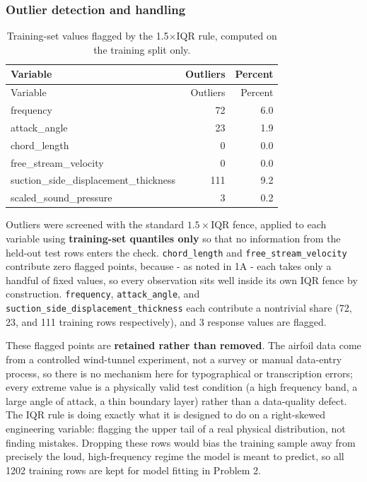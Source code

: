 \documentclass[
  11pt,
]{article}
\begin{document}
\subsubsection{Outlier detection and
handling}\label{outlier-detection-and-handling}

\begin{longtable}[]{@{}lrr@{}}
\caption{Training-set values flagged by the 1.5×IQR rule, computed on
the training split only.}\tabularnewline
\toprule\noalign{}
Variable & Outliers & Percent \\
\midrule\noalign{}
\endfirsthead
\toprule\noalign{}
Variable & Outliers & Percent \\
\midrule\noalign{}
\endhead
\bottomrule\noalign{}
\endlastfoot
frequency & 72 & 6.0 \\
attack\_angle & 23 & 1.9 \\
chord\_length & 0 & 0.0 \\
free\_stream\_velocity & 0 & 0.0 \\
suction\_side\_displacement\_thickness & 111 & 9.2 \\
scaled\_sound\_pressure & 3 & 0.2 \\
\end{longtable}

Outliers were screened with the standard \(1.5\times\text{IQR}\) fence,
applied to each variable using \textbf{training-set quantiles only} so
that no information from the held-out test rows enters the check.
\texttt{chord\_length} and \texttt{free\_stream\_velocity} contribute
zero flagged points, because - as noted in 1A - each takes only a
handful of fixed values, so every observation sits well inside its own
IQR fence by construction. \texttt{frequency}, \texttt{attack\_angle},
and \texttt{suction\_side\_displacement\_thickness} each contribute a
nontrivial share (72, 23, and 111 training rows respectively), and 3
response values are flagged.

These flagged points are \textbf{retained rather than removed}. The
airfoil data come from a controlled wind-tunnel experiment, not a survey
or manual data-entry process, so there is no mechanism here for
typographical or transcription errors; every extreme value is a
physically valid test condition (a high frequency band, a large angle of
attack, a thin boundary layer) rather than a data-quality defect. The
IQR rule is doing exactly what it is designed to do on a right-skewed
engineering variable: flagging the upper tail of a real physical
distribution, not finding mistakes. Dropping these rows would bias the
training sample away from precisely the loud, high-frequency regime the
model is meant to predict, so all 1202 training rows are kept for model
fitting in Problem 2.
\end{document}
